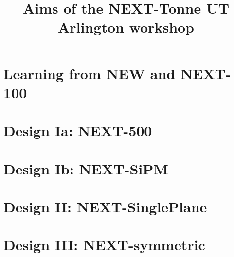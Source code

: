 \documentclass[11pt,a4paper]{article}
\begin{document}
\title{Aims of the NEXT-Tonne UT Arlington workshop}



\maketitle

\section{Learning from NEW and NEXT-100}

\section{Design Ia: NEXT-500}

\section{Design Ib: NEXT-SiPM}

\section{Design II: NEXT-SinglePlane}

\section{Design III: NEXT-symmetric}
\end{document}
